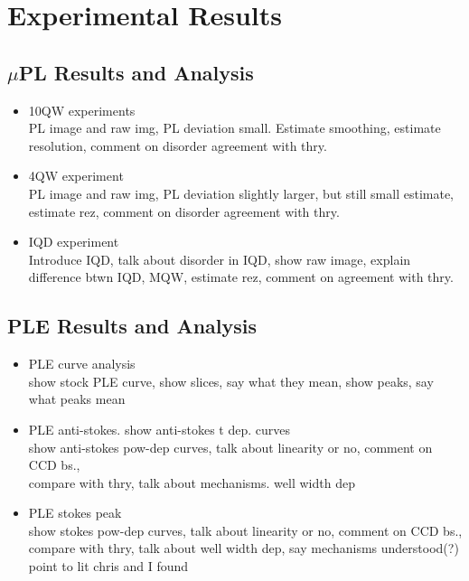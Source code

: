 \chapter{Experimental Results}

\section{$\mu$PL Results and Analysis}
\begin{itemize}
\item 10QW experiments\\
\* PL image and raw img, PL deviation small. Estimate smoothing, estimate resolution, comment on disorder agreement with thry.
\item 4QW experiment\\
\* PL image and raw img, PL deviation slightly larger, but still small estimate, estimate rez, comment on disorder agreement with thry.
\item IQD experiment\\
\* Introduce IQD, talk about disorder in IQD, show raw image, explain difference btwn IQD, MQW, estimate rez, comment on agreement with thry.


\end{itemize}
\section{PLE Results and Analysis}
\begin{itemize}
\item PLE curve analysis\\
show stock PLE curve, show slices, say what they mean, show peaks, say what peaks mean
\item PLE anti-stokes.
show anti-stokes t dep. curves\\
show anti-stokes pow-dep curves, talk about linearity or no, comment on CCD bs., \\
compare with thry, talk about mechanisms. well width dep
\item PLE stokes peak\\
show stokes pow-dep curves, talk about linearity or no, comment on CCD bs., \\
compare with thry, talk about well width dep, say mechanisms understood(?) point to lit chris and I found

\end{itemize}
